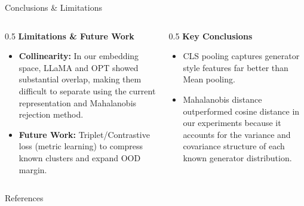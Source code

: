 \documentclass[aspectratio=169]{beamer}
\begin{document}
\begin{frame}{Conclusions \& Limitations}
\begin{columns}
\begin{column}{0.5\textwidth}
    \textbf{Limitations \& Future Work}
    \begin{itemize}
        \item \textbf{Collinearity:} In our embedding space, LLaMA and OPT showed substantial overlap, making them difficult to separate using the current representation and Mahalanobis rejection method.
        \item \textbf{Future Work:} Triplet/Contrastive loss (metric learning) to compress known clusters and expand OOD margin.
    \end{itemize}
\end{column}
\begin{column}{0.5\textwidth}
    \textbf{Key Conclusions}
    \begin{itemize}
        \item CLS pooling captures generator style features far better than Mean pooling.
        \item Mahalanobis distance outperformed cosine distance in our experiments because it accounts for the variance and covariance structure of each known generator distribution.
    \end{itemize}
\end{column}
\end{columns}
\end{frame}

\begin{frame}[allowframebreaks]{References}
\footnotesize


\end{frame}
\end{document}
